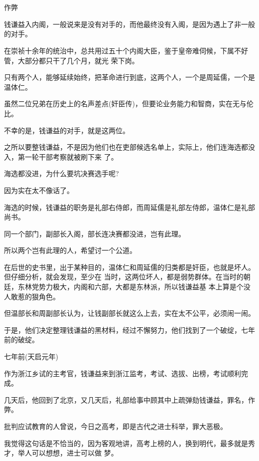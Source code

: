\documentclass[11pt,a4paper,onecolumn]{article}
\begin{document}
\section[\thesection]{}

作弊

钱谦益入内阁，一般说来是没有对手的，而他最终没有入阁，是因为遇上了非一般的对手。

在崇祯十余年的统治中，总共用过五十个内阁大臣，鉴于皇帝难伺候，下属不好管，大部分都只干了几个月，就光
荣下岗。

只有两个人，能够延续始终，把革命进行到底，这两个人，一个是周延儒，一个是温体仁。

虽然二位兄弟在历史上的名声差点(奸臣传)，但要论业务能力和智商，实在无与伦比。

不幸的是，钱谦益的对手，就是这两位。

之所以要整钱谦益，不是因为他们也在吏部候选名单上，实际上，他们连海选都没入，第一轮干部考察就被刷下来
了。

海选都没进，为什么要坑决赛选手呢?

因为实在太不像话了。

海选的时候，钱谦益的职务是礼部右侍郎，而周延儒是礼部左侍郎，温体仁是礼部尚书。

同一个部门，副部长入阁，部长连决赛都没进，岂有此理。

所以两个岂有此理的人，希望讨一个公道。

在后世的史书里，出于某种目的，温体仁和周延儒的归类都是奸臣，也就是坏人。但仔细分析，就会发现，至少在
当时，这两位坏人，都是弱势群体。在当时的朝廷，东林党势力极大，内阁和六部，大都是东林派，所以钱谦益基
本上算是个没人敢惹的狠角色。

但温部长和周副部长认为，让钱副部长就这么上去，实在太不公平，必须闹一闹。

于是，他们决定整理钱谦益的黑材料，经过不懈努力，他们找到了一个破绽，七年前的破绽。

七年前(天启元年)

作为浙江乡试的主考官，钱谦益来到浙江监考，考试、选拔、出榜，考试顺利完成。

几天后，他回到了北京，又几天后，礼部给事中顾其中上疏弹劾钱谦益，罪名，作弊。

批判应试教育的人曾说，今日之高考，即是古代之进士科举，罪大恶极。

我觉得这句话是不恰当的，因为客观地讲，高考上榜的人，换到明代，最多就是秀才，举人可以想想，进士可以做
梦。

\section[\thesection]{}
\end{document}
